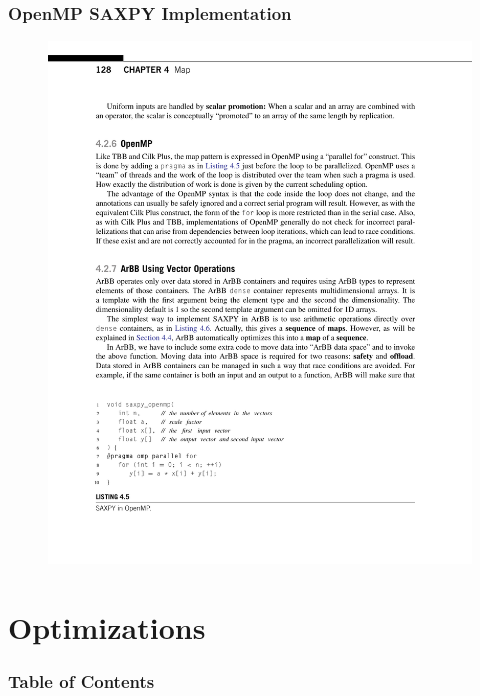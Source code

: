 \documentclass[xcolor=dvipsnames]{beamer}
\begin{document}
		\begin{frame} \frametitle{OpenMP SAXPY Implementation}
			\begin{figure}
				\centering
				\includegraphics[width=115mm]{images/listing-4-5.pdf}
			\end{figure}
		\end{frame}


\section{Optimizations} 

	\begin{frame} \frametitle{Table of Contents}
		\tableofcontents[currentsection]
	\end{frame} 
	
\end{document}

